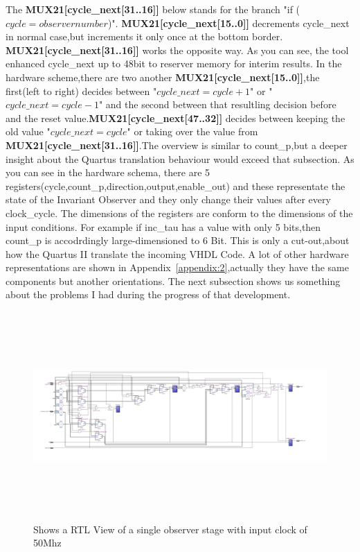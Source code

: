 The \textbf{MUX21[cycle\_next[31..16]]} below stands for the branch "if ($cycle=observernumber$)".\newline
\textbf{MUX21[cycle\_next[15..0]]} decrements cycle\_next in normal case,but increments it only once at the bottom border. 
\textbf{MUX21[cycle\_next[31..16]]} works the opposite way.
As you can see, the tool enhanced cycle\_next up to 48bit to reserver memory for 
interim results. \newline
In the hardware scheme,there are two another \textbf{MUX21[cycle\_next[15..0]]},the first(left to right) decides between  "$cycle\_next=cycle+1$" or "$cycle\_next=cycle-1$" and the second 
between that resultling decision before and the reset value.\textbf{MUX21[cycle\_next[47..32]]} decides between keeping the old value "$cycle\_next=cycle$" or 
taking over the value from \textbf{MUX21[cycle\_next[31..16]]}.The overview is similar to count\_p,but a deeper insight about the Quartus translation behaviour would exceed that subsection.
As you can see in the hardware schema, there are 5 registers(cycle,count\_p,direction,output,enable\_out) and these representate the state of the Invariant Observer and they only change their values
after every clock\_cycle. 
The dimensions of the registers are conform to the dimensions of the input conditions.
For example if inc\_tau has a value with only 5 bits,then count\_p is accodrdingly large-dimensioned to 6 Bit. 
This is only a cut-out,about how the Quartus II translate the incoming VHDL Code.
A lot of other hardware representations are shown in Appendix~\ref{appendix:2},actually they have the same components but another orientations.
The next subsection shows us something about the problems I had during the progress of that development.

\begin{figure}[]
\centering
\includegraphics[width=650px,height=300px,angle=-90]{../../pictures/22.02.2014/onlyObserver/OBS_50M.jpg}
\caption[RTL View of Observer 0 with clock 50Mhz]{Shows a RTL View of a single observer stage with input clock of 50Mhz}
\label{fig:test:only:50:obs0}
\end{figure}

